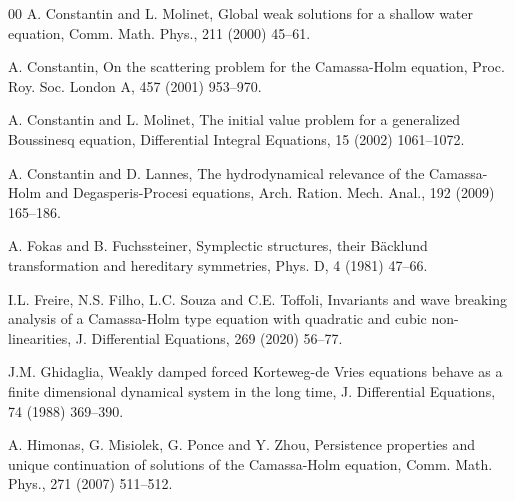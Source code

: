 \documentclass[preprint,12pt]{elsarticle}
\numberwithin{equation}{section}
\begin{document}
\begin{thebibliography}{00}
 A. Constantin and L. Molinet, Global weak solutions for a shallow water equation, Comm. Math. Phys., 211 (2000) 45--61.

 A. Constantin, On the scattering problem for the Camassa-Holm equation, Proc. Roy. Soc. London A, 457 (2001) 953--970.

 A. Constantin and L. Molinet, The initial value problem for a generalized Boussinesq equation, Differential Integral Equations, 15 (2002) 1061--1072.

 A. Constantin and D. Lannes, The hydrodynamical relevance of the Camassa-Holm and Degasperis-Procesi equations, Arch. Ration. Mech. Anal., 192 (2009) 165--186.


 A. Fokas and B. Fuchssteiner, Symplectic structures, their B\"acklund transformation and hereditary symmetries, Phys. D, 4 (1981) 47--66.

 I.L. Freire, N.S. Filho, L.C. Souza and C.E. Toffoli, Invariants and wave breaking analysis of a Camassa-Holm type equation with quadratic and cubic non-linearities, J. Differential Equations, 269 (2020) 56--77.



 J.M. Ghidaglia, Weakly damped forced Korteweg-de Vries equations behave as a finite dimensional dynamical system in the long time, J. Differential Equations, 74 (1988) 369--390.


 A. Himonas, G. Misiolek, G. Ponce and Y. Zhou, Persistence properties and unique continuation of solutions of the Camassa-Holm equation, Comm. Math. Phys., 271 (2007) 511--512.


\end{thebibliography}
\end{document}
